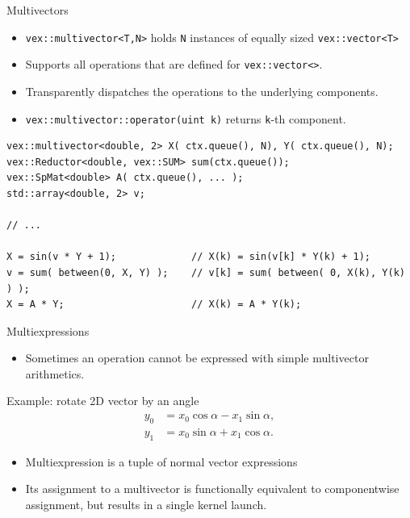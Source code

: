 \documentclass[@BEAMER_OPTIONS@]{beamer}
\newcommand{\code}[1]{\lstinline|#1|}
\begin{document}
\begin{frame}[fragile]{Multivectors}
    \begin{itemize}
        \item \code{vex::multivector<T,N>} holds \code{N} instances of equally
            sized \code{vex::vector<T>}
        \item Supports all operations that are defined for
            \code{vex::vector<>}.
        \item Transparently dispatches the operations to the underlying
            components.
        \item \code{vex::multivector::operator(uint k)} returns \code{k}-th
            component.
    \end{itemize}
    \begin{exampleblock}{}
        \begin{lstlisting}
vex::multivector<double, 2> X( ctx.queue(), N), Y( ctx.queue(), N);
vex::Reductor<double, vex::SUM> sum(ctx.queue());
vex::SpMat<double> A( ctx.queue(), ... );
std::array<double, 2> v;

// ...

X = sin(v * Y + 1);             // X(k) = sin(v[k] * Y(k) + 1);
v = sum( between(0, X, Y) );    // v[k] = sum( between( 0, X(k), Y(k) ) );
X = A * Y;                      // X(k) = A * Y(k);
        \end{lstlisting}
    \end{exampleblock}
\end{frame}


\begin{frame}[fragile]{Multiexpressions}
    \begin{itemize}
        \item Sometimes an operation cannot be expressed with simple
            multivector arithmetics.
    \end{itemize}
    \begin{block}{Example: rotate 2D vector by an angle}
        \vspace{-1\baselineskip}
        \begin{align*}
            y_0 &= x_0 \cos \alpha - x_1 \sin \alpha, \\
            y_1 &= x_0 \sin \alpha + x_1 \cos \alpha.
        \end{align*}
    \end{block}

    \begin{itemize}
        \item Multiexpression is a tuple of normal vector expressions
        \item Its assignment to a multivector is functionally equivalent to
            componentwise assignment, but results in a single kernel launch.
    \end{itemize}
\end{frame}
\end{document}
